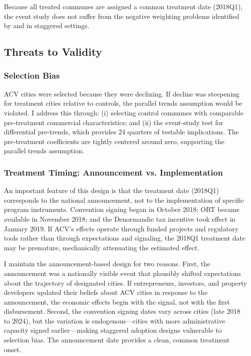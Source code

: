 \documentclass[12pt]{article}
\begin{document}
Because all treated communes are assigned a common treatment date (2018Q1), the event study does not suffer from the negative weighting problems identified by \citet{dechaisemartin2020two} and \citet{goodman2021difference} in staggered settings.

\subsection{Threats to Validity}

\subsubsection{Selection Bias}

ACV cities were selected because they were declining. If decline was steepening for treatment cities relative to controls, the parallel trends assumption would be violated. I address this through: (i) selecting control communes with comparable pre-treatment commercial characteristics; and (ii) the event-study test for differential pre-trends, which provides 24 quarters of testable implications. The pre-treatment coefficients are tightly centered around zero, supporting the parallel trends assumption.

\subsubsection{Treatment Timing: Announcement vs. Implementation}

An important feature of this design is that the treatment date (2018Q1) corresponds to the national announcement, not to the implementation of specific program instruments. Convention signing began in October 2018; ORT became available in November 2018; and the Denormandie tax incentive took effect in January 2019. If ACV's effects operate through funded projects and regulatory tools rather than through expectations and signaling, the 2018Q1 treatment date may be premature, mechanically attenuating the estimated effect.

I maintain the announcement-based design for two reasons. First, the announcement was a nationally visible event that plausibly shifted expectations about the trajectory of designated cities. If entrepreneurs, investors, and property developers updated their beliefs about ACV cities in response to the announcement, the economic effects begin with the signal, not with the first disbursement. Second, the convention signing dates vary across cities (late 2018 to 2024), but the variation is endogenous---cities with more administrative capacity signed earlier---making staggered adoption designs vulnerable to selection bias. The announcement date provides a clean, common treatment onset.
\end{document}
